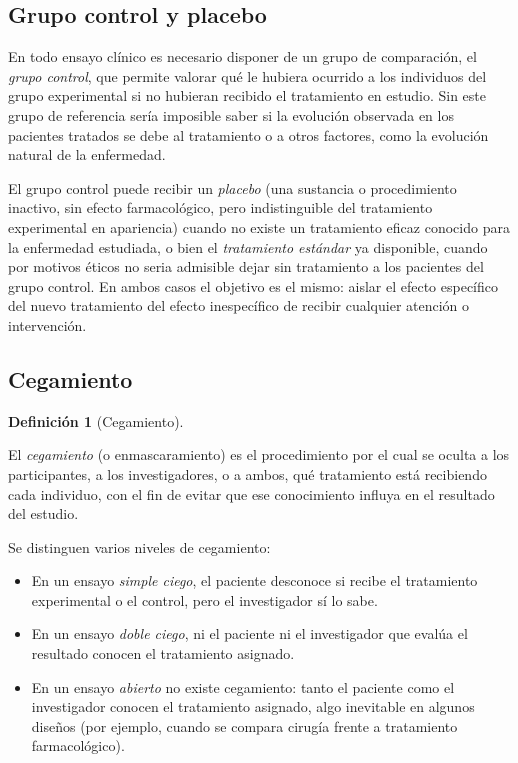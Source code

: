 \documentclass[
  spanish,
  a4paper,
]{scrreport}
\providecommand{\tightlist}{%
  \setlength{\itemsep}{0pt}\setlength{\parskip}{0pt}}
\theoremstyle{definition}
\theoremstyle{definition}
\newtheorem{definition}{Definición}[chapter]
\theoremstyle{remark}
\begin{document}
\subsection{Grupo control y placebo}\label{grupo-control-y-placebo}

En todo ensayo clínico es necesario disponer de un grupo de comparación,
el \emph{grupo control}, que permite valorar qué le hubiera ocurrido a
los individuos del grupo experimental si no hubieran recibido el
tratamiento en estudio. Sin este grupo de referencia sería imposible
saber si la evolución observada en los pacientes tratados se debe al
tratamiento o a otros factores, como la evolución natural de la
enfermedad.

El grupo control puede recibir un \emph{placebo} (una sustancia o
procedimiento inactivo, sin efecto farmacológico, pero indistinguible
del tratamiento experimental en apariencia) cuando no existe un
tratamiento eficaz conocido para la enfermedad estudiada, o bien el
\emph{tratamiento estándar} ya disponible, cuando por motivos éticos no
seria admisible dejar sin tratamiento a los pacientes del grupo control.
En ambos casos el objetivo es el mismo: aislar el efecto específico del
nuevo tratamiento del efecto inespecífico de recibir cualquier atención
o intervención.

\subsection{Cegamiento}\label{cegamiento}

\begin{definition}[Cegamiento]\protect\hypertarget{def-experimentales-cegamiento}{}\label{def-experimentales-cegamiento}

El \emph{cegamiento} (o enmascaramiento) es el procedimiento por el cual
se oculta a los participantes, a los investigadores, o a ambos, qué
tratamiento está recibiendo cada individuo, con el fin de evitar que ese
conocimiento influya en el resultado del estudio.

\end{definition}

Se distinguen varios niveles de cegamiento:

\begin{itemize}
\tightlist
\item
  En un ensayo \emph{simple ciego}, el paciente desconoce si recibe el
  tratamiento experimental o el control, pero el investigador sí lo
  sabe.
\item
  En un ensayo \emph{doble ciego}, ni el paciente ni el investigador que
  evalúa el resultado conocen el tratamiento asignado.
\item
  En un ensayo \emph{abierto} no existe cegamiento: tanto el paciente
  como el investigador conocen el tratamiento asignado, algo inevitable
  en algunos diseños (por ejemplo, cuando se compara cirugía frente a
  tratamiento farmacológico).
\end{itemize}
\end{document}
